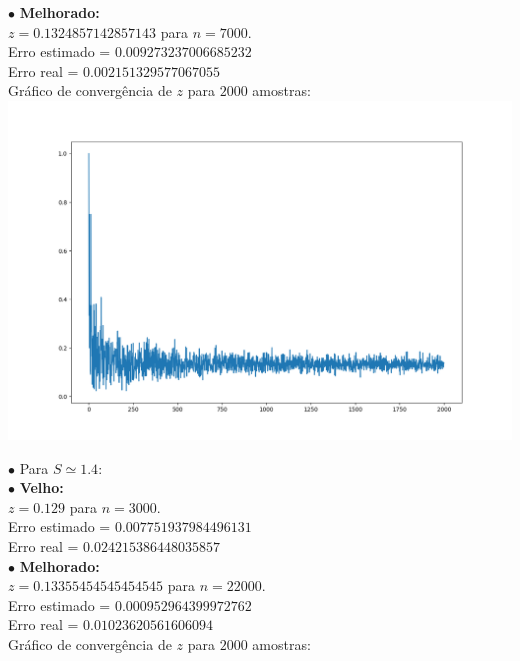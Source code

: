 \documentclass[pt12]{article}
\begin{document}
\indent \indent $\bullet$ \textbf{Melhorado:}\\

\indent \indent $z  = 0.1324857142857143$ para $n = 7000$.\\
\indent \indent Erro estimado = $0.009273237006685232$\\
\indent \indent Erro real = $0.002151329577067055$\\

\newpage
\indent \indent Gráfico de convergência de $z$ para $2000$ amostras:\\

\includegraphics[scale=0.4]{ConvergZ_M_2.png}

\indent $\bullet$ Para $S \simeq 1.4$:\\

\indent \indent $\bullet$ \textbf{Velho:}\\

\indent \indent $z  = 0.129$ para $n = 3000$.\\
\indent \indent Erro estimado = $0.007751937984496131$\\
\indent \indent Erro real = $0.024215386448035857$\\

\indent \indent $\bullet$ \textbf{Melhorado:}\\

\indent \indent $z  = 0.13355454545454545$ para $n = 22000$.\\
\indent \indent Erro estimado = $0.000952964399972762$\\
\indent \indent Erro real = $0.01023620561606094$\\

\newpage
\indent \indent Gráfico de convergência de $z$ para $2000$ amostras:\\
\end{document}
